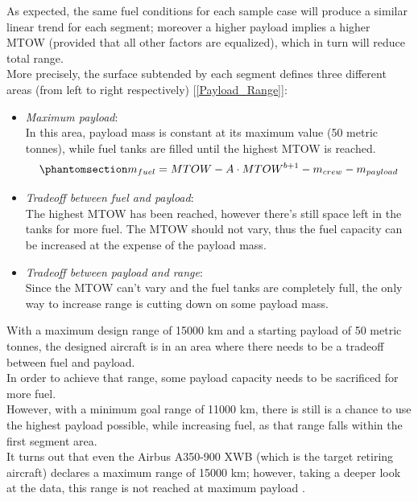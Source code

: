 \documentclass{article}
\begin{document}
As expected, the same fuel conditions for each sample case will produce a similar linear trend for each segment; moreover a higher
payload implies a higher MTOW (provided that all other factors are equalized), which in turn will reduce total range.\\ 
More precisely, the surface subtended by each segment defines three different areas (from left to right respectively) [\ref{Payload_Range}]:
\begin{itemize}
    \item \textit{Maximum payload}: \\ 
        In this area, payload mass is constant at its maximum value (50 metric tonnes), while fuel tanks are
        filled until the highest MTOW is reached. 
        \begin{equation}
            \phantomsection
            m_{fuel} = MTOW - A \cdot MTOW^{b+1} - m_{crew} - m_{payload}
            \label{payload_range_fuel_mass}
        \end{equation}
    \item \textit{Tradeoff between fuel and payload}: \\ 
        The highest MTOW has been reached, however there's still space left in the tanks for more fuel.
        The MTOW should not vary, thus the fuel capacity can be increased at the expense of the payload mass.
    \item \textit{Tradeoff between payload and range}: \\ 
        Since the MTOW can't vary and the fuel tanks are completely full, the only way to increase range is cutting down
        on some payload mass.
\end{itemize}

With a maximum design range of 15000 km and a starting payload of 50 metric tonnes, 
the designed aircraft is in an area where there needs to be a tradeoff between fuel and payload.\\ 
In order to achieve that range, some payload capacity needs to be sacrificed for more fuel.\\ 
However, with a minimum goal range of 11000 km, there is still is a chance to use the highest payload possible,
while increasing fuel, as that range falls within the first segment area. \\ 
It turns out that even the Airbus A350-900 XWB (which is the target retiring aircraft) declares
a maximum range of 15000 km; however, taking a deeper look at the data, this range is not reached at maximum payload \autocite{Airbus_A350-900}.
\end{document}
